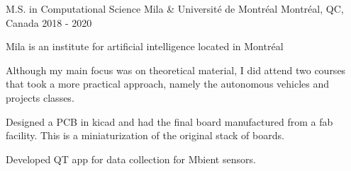 

\begin{cventries}

  \cventry
    {M.S. in Computational Science} %
    {Mila \& Université de Montréal} %
    {Montréal, QC, Canada} %
    {2018 - 2020} %
    {
        \begin{cvitems} %
        \item {Mila is an institute for artificial intelligence located in Montréal}
        \item {Although my main focus was on theoretical material, I did attend two courses that took a more practical approach, namely the autonomous vehicles and projects classes.}
        \item {Designed a PCB in kicad and had the final board manufactured from a fab facility. This is a miniaturization of the original stack of boards.}
         \item {Developed QT app for data collection for Mbient sensors.}
      \end{cvitems}
    }
    
\end{cventries}
